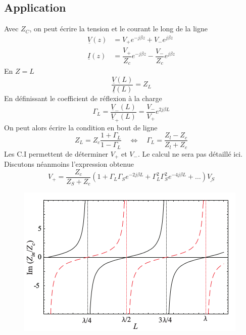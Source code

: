 	\subsection{Application}
	Avec $Z_C$, on peut écrire la tension et le courant le long de la ligne
	\begin{equation}
	\begin{array}{ll}
	\underline{V}(z) &= V_+e^{-j\beta z} + V_-e^{j\beta z}\\
	\underline{I}(z) &= \dfrac{V_+}{Z_c} e^{-j\beta z} - \dfrac{V_-}{Z_c}e^{j\beta z}	
	\end{array}
	\label{eq:2.45}
	\end{equation}
	En $Z=L$
	\begin{equation}
	\dfrac{\underline{V}(L)}{\underline{I}(L)} = Z_L
	\end{equation}
	En définissant le coefficient de réflexion à la charge
	\begin{equation}
	\Gamma_L = \dfrac{\underline{V}_-(L)}{\underline{V}_+(L)} = \dfrac{V_-}{V_+}e^{2j\beta L}
	\label{eq:2.47}
	\end{equation}
	On peut alors écrire la condition en bout de ligne
	\begin{equation}
	Z_L = Z_c\dfrac{1+\Gamma_L}{1-\Gamma_L}\quad\Leftrightarrow\quad \Gamma_L = \dfrac{Z_l-Z_c}{
	Z_l+Z_c}
	\end{equation}
	Les C.I permettent de déterminer $V_+$ et $V_-$. Le calcul ne sera pas détaillé ici. Discutons 
	néanmoins l'expression obtenue
	\begin{equation}
	V_+ = \dfrac{Z_c}{Z_S+Z_c}\left(1+\Gamma_L\Gamma_Se^{-2j\beta L}+\Gamma_L^2\Gamma_S^2e^{-4j\beta L}
	+\dots\right)\underline{V_S}
	\end{equation}
	\begin{figure}
	\vspace{-5mm}
	\includegraphics[scale=0.45]{ch2/image6.png}
	\end{figure}
